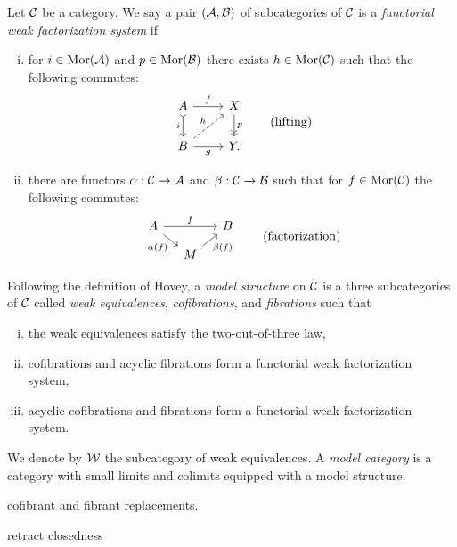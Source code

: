 \documentclass{../../large}
\begin{document}
\begin{prb}
Let $\mathcal{C}$ be a category.
We say a pair $(\mathcal{A},\mathcal{B})$ of subcategories of $\mathcal{C}$ is a \emph{functorial weak factorization system} if
\begin{enumerate}[(i)]
\item for $i\in\operatorname{Mor}(\mathcal{A})$ and $p\in\operatorname{Mor}(\mathcal{B})$ there exists $h\in\operatorname{Mor}(\mathcal{C})$ such that the following commutes:
\[\begin{tikzcd}
A \dar[>->,swap]{i} \rar{f} & X \dar[->>]{p} \\
B \rar[swap]{g} \ar[dashed]{ur}{h} & Y.
\end{tikzcd}\tag{lifting}\]
\item there are functors $\alpha:\mathcal{C}\to\mathcal{A}$ and $\beta:\mathcal{C}\to\mathcal{B}$ such that for $f\in\operatorname{Mor}(\mathcal{C})$ the following commutes:
\[\begin{tikzcd}[sep=small]
A \ar{rr}{f} \ar[swap]{dr}{\alpha(f)} && B \\
& M \ar[swap]{ur}{\beta(f)} &
\end{tikzcd}\tag{factorization}\]
\end{enumerate}



Following the definition of Hovey, a \emph{model structure} on $\mathcal{C}$ is a three subcategories of $\mathcal{C}$ called \emph{weak equivalences}, \emph{cofibrations}, and \emph{fibrations} such that
\begin{enumerate}[(i)]
\item the weak equivalences satisfy the two-out-of-three law,
\item cofibrations and acyclic fibrations form a functorial weak factorization system,
\item acyclic cofibrations and fibrations form a functorial weak factorization system.
\end{enumerate}
We denote by $\mathcal{W}$ the subcategory of weak equivalences.
A \emph{model category} is a category with small limits and colimits equipped with a model structure.

cofibrant and fibrant replacements.

\begin{parts}
\item retract closedness
\item
\end{parts}
\end{prb}
\end{document}
